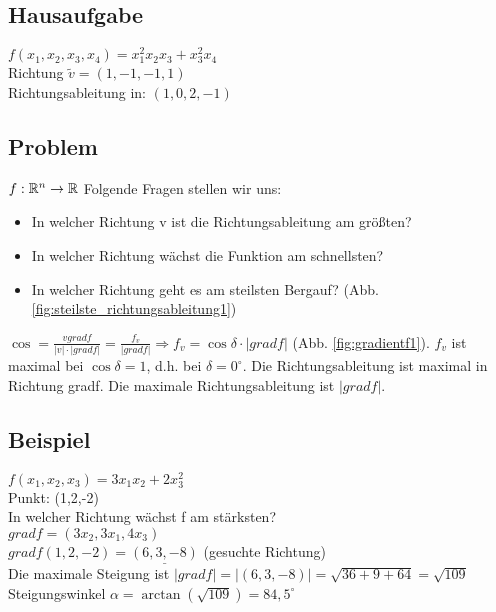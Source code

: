 \subsection{Hausaufgabe}
$ f(x_1, x_2, x_3, x_4) = x_1^2 x_2 x_3 + x_3^2 x_4$\\
Richtung $ \tilde{v} = (1,-1,-1,1) $ \\
Richtungsableitung in: $ (1,0,2,-1) $

\subsection{Problem} $ f:\mathbb{R}^n \rightarrow \mathbb{R} $
Folgende Fragen stellen wir uns: 
\begin{itemize}


\item In welcher Richtung v ist die Richtungsableitung am größten?
\item In welcher Richtung wächst die Funktion am schnellsten?
\item In welcher Richtung geht es am steilsten Bergauf? (Abb. \ref{fig:steilste_richtungsableitung1})
\end{itemize}


$ \cos = \frac{v gradf}{|v| \cdot |gradf|} = \frac{f_v}{|gradf|} \Rightarrow f_v=\cos \delta \cdot |gradf| $ (Abb. \ref{fig:gradientf1}). $f_v$ ist maximal bei $\cos \delta = 1$, d.h. bei $\delta=0^\circ$. Die Richtungsableitung ist maximal in Richtung gradf. Die maximale Richtungsableitung ist $|gradf|$. 

\subsection{Beispiel}
$ f(x_1,x_2,x_3) = 3x_1x_2 + 2x_3^2 $\\
Punkt: (1,2,-2)\\
In welcher Richtung wächst f am stärksten? \\
$ gradf = (3x_2, 3x_1, 4x_3) $\\
$ gradf(1,2,-2) = \underline{(6,3,-8)} $ (gesuchte Richtung)\\
Die maximale Steigung ist $ |gradf| = |(6,3,-8)| = \sqrt{36+9+64} = \sqrt{109} $\\
Steigungswinkel $\alpha = \arctan (\sqrt{109}) = 84,5^\circ $ 

